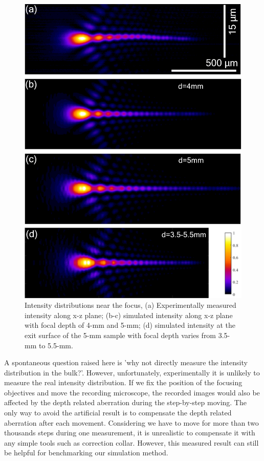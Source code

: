 \documentclass[9pt,twocolumn,twoside]{osajnl}
\begin{document}
\begin{figure}[t]
	\centering
	\includegraphics[width=\linewidth]{../AppOptics/figures/50xSi.pdf}
	\caption{Intensity distributions near the focus, (a) Experimentally measured intensity along x-z plane; (b-c) simulated intensity along x-z plane with focal depth of 4-mm and 5-mm; (d) simulated intensity at the exit surface of the 5-mm sample with focal depth varies from 3.5-mm to 5.5-mm.}\label{fig:5}
\end{figure}

A spontaneous question raised here is 'why not directly measure the intensity distribution in the bulk?'. However, unfortunately, experimentally it is unlikely to measure the real intensity distribution. If we fix the position of the focusing objectives and move the recording microscope, the recorded images would also be affected by the depth related aberration during the step-by-step moving. The only way to avoid the artificial result is to compensate the depth related aberration after each movement. Considering we have to move for more than two thousands steps during one measurement, it is unrealistic to compensate it with any simple tools such as correction collar. However, this measured result can still be helpful for benchmarking our simulation method.
\end{document}
